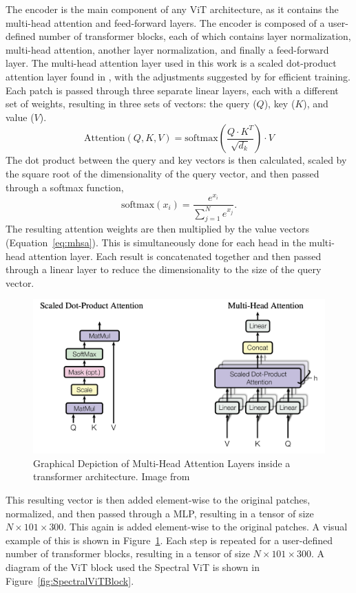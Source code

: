 The encoder is the main component of any ViT architecture, as it contains the 
multi-head attention and feed-forward layers. The encoder is composed of a user-defined number of
transformer blocks, each of which contains layer normalization, multi-head attention, another 
layer normalization, and finally a feed-forward layer. The multi-head attention layer 
used in this work is a scaled dot-product attention layer found in \textcite{vaswani2017}, with the adjustments suggested by  \textcite{Xiong2020} for efficient training. Each patch 
is passed through three separate linear layers, each with a different set of weights, 
resulting in three sets of vectors: the query ($Q$), key ($K$), and value ($V$).
\begin{equation}
    \label{eq:mhsa}
    \text{Attention}(Q, K, V) = \text{softmax}\left(\frac{Q\cdot K^T}{\sqrt{d_k}}\right)\cdot V
\end{equation}
The dot product between the query and key vectors is then calculated,
scaled by the square root of the dimensionality of the query vector, and then passed through a softmax function,
\begin{equation}
    \text{softmax}(x_i) = \frac{e^{x_i}}{\sum_{j=1}^N e^{x_j}}.
\end{equation}
The resulting attention weights are then multiplied by the value vectors (Equation~\ref{eq:mhsa}). 
This is simultaneously done for each head in the multi-head attention layer. Each result is concatenated together and then passed through a linear layer to reduce the dimensionality
to the size of the query vector. 
\begin{figure}[hb!]
    \centering
    \includegraphics[width=.9\textwidth]{figures/transformer_paper/SelfAttention_MHSA.png}
    \caption[Transformer Attention]{Graphical Depiction of Multi-Head Attention Layers inside a 
    transformer architecture. Image from \textcite{vaswani2017}}
    \label{fig:attention}
\end{figure}
This resulting vector is then added
element-wise to the original patches, normalized, and then passed through a MLP, 
resulting in a tensor of size $N \times 101 \times 300$. This again is added element-wise to the original patches. A 
visual example of this is shown in Figure~\ref{fig:attention}. 
Each step is repeated for a user-defined number of transformer blocks, resulting in a tensor of size
$N \times 101 \times 300$. A diagram of the ViT block used the Spectral ViT is shown in 
Figure~\ref{fig:SpectralViTBlock}. 



